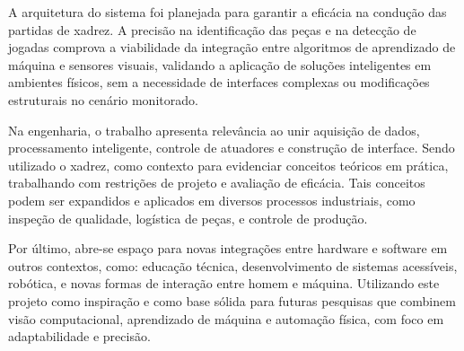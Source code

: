 \documentclass[journal]{IEEEtran} %
\begin{document}
A arquitetura do sistema foi planejada para garantir a eficácia na condução das partidas de xadrez. A precisão na identificação das peças e na detecção de jogadas comprova a viabilidade da integração entre algoritmos de aprendizado de máquina e sensores visuais, validando a aplicação de soluções inteligentes em ambientes físicos, sem a necessidade de interfaces complexas ou modificações estruturais no cenário monitorado.

Na engenharia, o trabalho apresenta relevância ao unir aquisição de dados, processamento inteligente, controle de atuadores e construção de interface. Sendo utilizado o xadrez, como contexto para evidenciar conceitos teóricos em prática, trabalhando com restrições de projeto e avaliação de eficácia. Tais conceitos podem ser expandidos e aplicados em diversos processos industriais, como inspeção de qualidade, logística de peças, e controle de produção.

Por último, abre-se espaço para novas integrações entre hardware e software em outros contextos, como: educação técnica, desenvolvimento de sistemas acessíveis, robótica, e novas formas de interação entre homem e máquina. Utilizando este projeto como inspiração e como base sólida para futuras pesquisas que combinem visão computacional, aprendizado de máquina e automação física, com foco em adaptabilidade e precisão.


 
\end{document}
